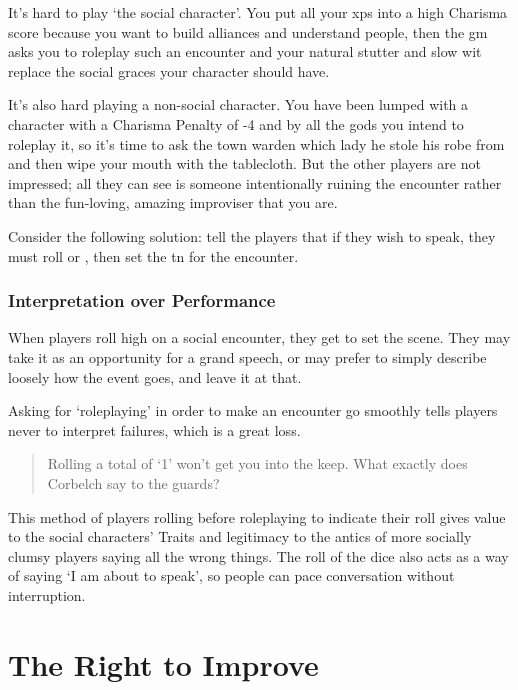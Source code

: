 \begin{multicols}{2}

\noindent
It's hard to play `the social character'.
You put all your \glspl{xp} into a high Charisma score because you want to build alliances and understand people, then the \gls{gm} asks you to roleplay such an encounter and your natural stutter and slow wit replace the social graces your character should have.

It's also hard playing a non-social character.
You have been lumped with a character with a Charisma Penalty of -4 and by all the gods you intend to roleplay it, so it's time to ask the town warden which lady he stole his robe from and then wipe your mouth with the tablecloth.
But the other players are not impressed; all they can see is someone intentionally ruining the encounter rather than the fun-loving, amazing improviser that you are.

Consider the following solution: tell the players that if they wish to speak, they must roll  or , then set the \gls{tn} for the encounter.

\subsubsection{Interpretation over Performance}

When players roll high on a social encounter, they get to set the scene.
They may take it as an opportunity for a grand speech, or may prefer to simply describe loosely how the event goes, and leave it at that.

Asking for `roleplaying' in order to make an encounter go smoothly tells players never to interpret failures, which is a great loss.

\begin{quotation}
  Rolling a total of `1' won't get you into the keep.
  What exactly does Corbelch say to the guards?
\end{quotation}

This method of players rolling before roleplaying to indicate their roll gives value to the social characters' Traits and legitimacy to the antics of more socially clumsy players saying all the wrong things.
The roll of the dice also acts as a way of saying `I am about to speak', so people can pace conversation without interruption.

\end{multicols}

\pagebreak
\section*{The Right to Improve}

